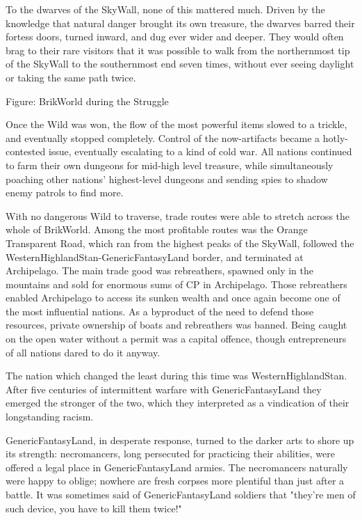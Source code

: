 \documentclass[12pt,a4paper,twocolumn]{article}
\begin{document}
To the dwarves of the SkyWall, none of this mattered much.  Driven by the knowledge that natural danger brought its own treasure, the dwarves barred their fortess doors, turned inward, and dug ever wider and deeper.  They would often brag to their rare visitors that it was possible to walk from the northernmost tip of the SkyWall to the southernmost end seven times, without ever seeing daylight or taking the same path twice.

Figure: BrikWorld during the Struggle

Once the Wild was won, the flow of the most powerful items slowed to a trickle, and eventually stopped completely.  Control of the now-artifacts became a hotly-contested issue, eventually escalating to a kind of cold war.  All nations continued to farm their own dungeons for mid-high level treasure, while simultaneously poaching other nations' highest-level dungeons and sending spies to shadow enemy patrols to find more.  

With no dangerous Wild to traverse, trade routes were able to stretch across the whole of BrikWorld.  Among the most profitable routes was the Orange Transparent Road, which ran from the highest peaks of the SkyWall, followed the WesternHighlandStan-GenericFantasyLand border, and  terminated at Archipelago.  The main trade good was rebreathers, spawned only in the mountains and sold for enormous sums of CP in Archipelago.  Those rebreathers enabled Archipelago to access its sunken wealth and once again become one of the most influential nations.  As a byproduct of the need to defend those resources, private ownership of boats and rebreathers was banned.  Being caught on the open water without a permit was a capital offence, though entrepreneurs of all nations dared to do it anyway.

The nation which changed the least during this time was WesternHighlandStan.  After five centuries of intermittent warfare with GenericFantasyLand they emerged the stronger of the two, which they interpreted as a vindication of their longstanding racism.  

GenericFantasyLand, in desperate response, turned to the darker arts to shore up its strength: necromancers, long persecuted for practicing their abilities, were offered a legal place in GenericFantasyLand armies.  The necromancers naturally were happy to oblige; nowhere are fresh corpses more plentiful than just after a battle.  It was sometimes said of GenericFantasyLand soldiers that "they're men of such device, you have to kill them twice!"
\end{document}
